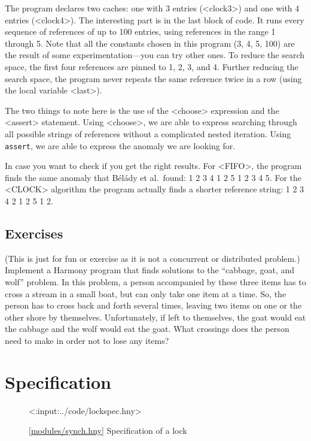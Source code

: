 \documentclass{report}
\newcommand{\harmonylink}[1]{%
[\href{https://harmony.cs.cornell.edu/#1}{\underline{#1}}]%
}
\newenvironment{code}{
\tcolorbox
}{
\endtcolorbox
}
\begin{document}
The program declares two caches: one with 3 entries (<{clock3}>)
and one with 4 entries (<{clock4}>).
The interesting part is in the last block of code.
It runs every sequence of references of up to 100 entries, using
references in the range 1 through 5.
Note that all the constants chosen in this program (3, 4, 5, 100)
are the result of some experimentation---you can try other ones.
To reduce the search space, the first four references are pinned
to 1, 2, 3, and 4.
Further reducing the search space, the program never repeats the
same reference twice in a row (using the local variable <{last}>).

The two things to note here is the use of the <{choose}>
expression and the <{assert}> statement.  Using <{choose}>,
we are able to express searching through all possible strings of
references without a complicated nested iteration.
Using \texttt{assert}, we are able to express the anomaly we are
looking for.

In case you want to check if you get the right results.  For <{FIFO}>,
the program finds the same anomaly that
B\'{e}l\'{a}dy et al.~found: 1 2 3 4 1 2 5 1 2 3 4 5.
For the <{CLOCK}> algorithm the program actually finds a shorter
reference string: 1 2 3 4 2 1 2 5 1 2.

\section*{Exercises}
\begin{problems}
\item (This is just for fun or exercise as it is not a concurrent or
distributed problem.)
Implement a Harmony program that finds solutions to the
``cabbage, goat, and wolf'' problem.  In this problem, a person
accompanied by these three items has to cross a stream in a small
boat, but can only take one item at a time. So, the person has to
cross back and forth several times, leaving two items on one or
the other shore by themselves.
Unfortunately, if left to themselves, the goat would
eat the cabbage and the wolf would eat the goat.  What crossings
does the person need to make in order not to lose any items?
\end{problems}

\chapter{Specification}
\label{ch:specification}

\begin{figure}
\begin{code}
<{:input:../code/lockspec.hny}>
\end{code}
\caption{\harmonylink{modules/synch.hny} Specification of a lock}
\label{fig:lockspec}
\end{figure}
\end{document}

